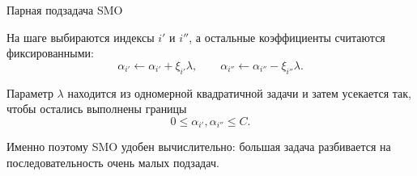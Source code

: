 \SPBGContentSlide
  {Парная подзадача SMO}
  {%
    \FormulaBody
    На шаге выбираются индексы \(i'\) и \(i''\), а остальные коэффициенты
    считаются фиксированными:
    \[
      \alpha_{i'}\leftarrow \alpha_{i'}+\xi_{i'}\lambda,
      \qquad
      \alpha_{i''}\leftarrow \alpha_{i''}-\xi_{i''}\lambda.
    \]

    Параметр \(\lambda\) находится из одномерной квадратичной задачи и
    затем усекается так, чтобы остались выполнены границы
    \[
      0\leq\alpha_{i'},\alpha_{i''}\leq C.
    \]

    \Body
    Именно поэтому SMO удобен вычислительно: большая задача разбивается
    на последовательность очень малых подзадач.
  }

